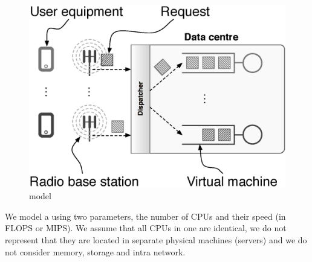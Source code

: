 \subsection{\Dc}
\begin{figure}[tb]
	\centering
	\includegraphics[width=\linewidth]{fig_dc_model.eps} 
	\caption{\Dc{} model}
	\label{fig:dc_model}
\end{figure}

We model a \dc{} using two parameters, the number of CPUs and their speed (in FLOPS or MIPS).
We assume that all CPUs in one \dc{} are identical, we do not represent that they are located in separate physical machines (servers) and we do not consider memory, storage and intra \dc{} network.




